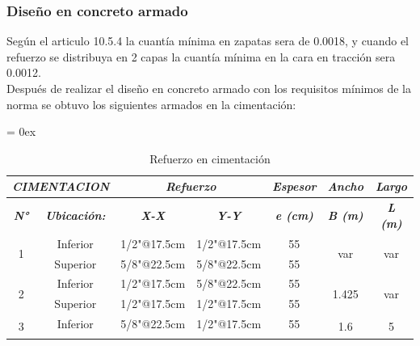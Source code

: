 \subsubsection{Diseño en concreto armado}
\noindent 
Según el articulo 10.5.4 la cuantía mínima en zapatas sera de 0.0018, y cuando el refuerzo se distribuya en 2 capas la cuantía mínima en la cara en tracción sera 0.0012.\\
Después de realizar el diseño en concreto armado con los requisitos mínimos de la norma se obtuvo los siguientes armados en la cimentación:
\begin{table}[h!]
\caption{Refuerzo en cimentación}
{
\extrarowheight = 0ex
\renewcommand{\arraystretch}{1.2}
\begin{tabular}{|cc|cc|c|c|c|}
\hline
\multicolumn{2}{|c|}{\textit{\textbf{CIMENTACION}}}                       & \multicolumn{2}{c|}{\textit{\textbf{Refuerzo}}}                    & \textit{\textbf{Espesor}} & \textit{\textbf{Ancho}} & \textit{\textbf{Largo}} \\ \hline
\multicolumn{1}{|c|}{\textit{\textbf{N°}}} & \textit{\textbf{Ubicación:}} & \multicolumn{1}{c|}{\textit{\textbf{X-X}}} & \textit{\textbf{Y-Y}} & \textit{\textbf{e (cm)}}  & \textit{\textbf{B (m)}} & \textit{\textbf{L (m)}} \\ \hline
\multicolumn{1}{|c|}{\multirow{2}{*}{1}}   & Inferior                     & \multicolumn{1}{c|}{1/2"@17.5cm}           & 1/2"@17.5cm           & 55                        & \multirow{2}{*}{var}    & \multirow{2}{*}{var}    \\ \cline{2-5}
\multicolumn{1}{|c|}{}                     & Superior                     & \multicolumn{1}{c|}{5/8"@22.5cm}           & 5/8"@22.5cm           & 55                        &                         &                         \\ \hline
\multicolumn{1}{|c|}{\multirow{2}{*}{2}}   & Inferior                     & \multicolumn{1}{c|}{1/2"@17.5cm}           & 5/8"@22.5cm           & 55                        & \multirow{2}{*}{1.425}  & \multirow{2}{*}{var}    \\ \cline{2-5}
\multicolumn{1}{|c|}{}                     & Superior                     & \multicolumn{1}{c|}{1/2"@17.5cm}           & 1/2"@17.5cm           & 55                        &                         &                         \\ \hline
\multicolumn{1}{|c|}{\multirow{2}{*}{3}}   & Inferior                     & \multicolumn{1}{c|}{5/8"@22.5cm}           & 1/2"@17.5cm           & 55                        & \multirow{2}{*}{1.6}    & \multirow{2}{*}{5}      \\ \cline{2-5}

\end{tabular}}
\end{table}
